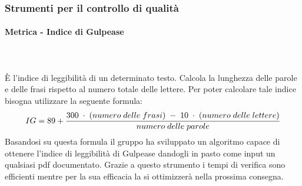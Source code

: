 \subsubsection{Strumenti per il controllo di qualità}
\paragraph{Metrica - Indice di Gulpease}\mbox{} \\ \\
È l'indice di leggibilità di un determinato testo. Calcola la lunghezza delle parole e delle frasi rispetto al numero totale delle lettere. Per poter calcolare tale indice bisogna utilizzare la seguente formula:
$$IG = 89 + {{300 \; \cdot \; (numero\; delle \; frasi) \; - \; 10 \; \cdot \; (numero \; delle \; lettere)}\over numero \; delle \; parole}$$
Basandosi su questa formula il gruppo \Gruppo ha sviluppato un algoritmo capace di ottenere l'indice di leggibilità di Gulpease dandogli in pasto come input un qualsiasi pdf 
documentato. Grazie a questo strumento i tempi di verifica sono efficienti mentre per la sua efficacia la si ottimizzerà nella prossima consegna.